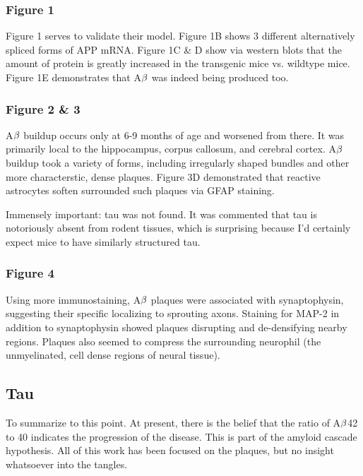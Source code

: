 \subsubsection*{Figure 1}

Figure 1 serves to validate their model. Figure 1B shows 3 different alternatively spliced forms of APP mRNA. Figure 1C \& D show via western blots that the amount of protein is greatly increased in the transgenic mice vs. wildtype mice. Figure 1E demonstrates that A$\beta$ was indeed being produced too. 

\subsubsection*{Figure 2 \& 3}

 A$\beta$ buildup occurs only at 6-9 months of age and worsened from there. It was primarily local to the hippocampus, corpus callosum, and cerebral cortex. A$\beta$ buildup took a variety of forms, including irregularly shaped bundles and other more characterstic, dense plaques. Figure 3D demonstrated that reactive astrocytes soften surrounded such plaques via GFAP staining.\newline

Immensely important: tau was not found. It was commented that tau is notoriously absent from rodent tissues, which is surprising because I'd certainly expect mice to have similarly structured tau.

\subsubsection*{Figure 4}

Using more immunostaining, A$\beta$ plaques were associated with synaptophysin, suggesting their specific localizing to sprouting axons.  Staining for MAP-2 in addition to synaptophysin showed plaques disrupting and de-densifying nearby regions. Plaques also seemed to compress the surrounding neurophil (the unmyelinated, cell dense regions of neural tissue). 


\subsection*{Tau}

 To summarize to this point. At present, there is the belief that the ratio of A$\beta$42 to 40 indicates the progression of the disease. This is part of the amyloid cascade hypothesis. All of this work has been focused on the plaques, but no insight whatsoever into the tangles.\newline

